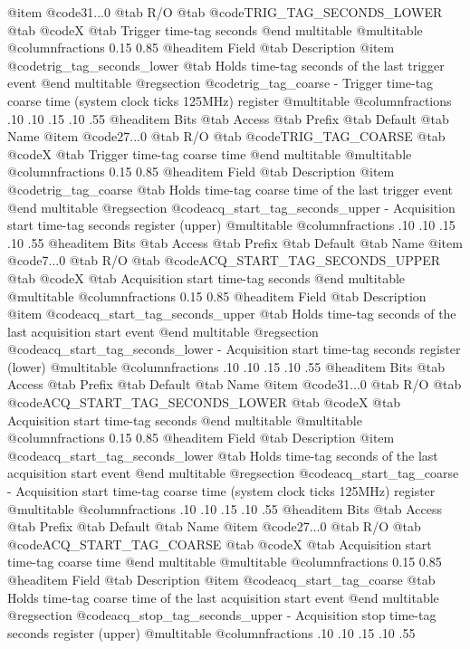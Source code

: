 @item @code{31...0}
@tab R/O @tab
@code{TRIG_TAG_SECONDS_LOWER}
@tab @code{X} @tab 
Trigger time-tag seconds
@end multitable
@multitable @columnfractions 0.15 0.85
@headitem Field @tab Description
@item @code{trig_tag_seconds_lower} @tab Holds time-tag seconds of the last trigger event
@end multitable
@regsection @code{trig_tag_coarse} - Trigger time-tag coarse time (system clock ticks 125MHz) register
@multitable @columnfractions .10 .10 .15 .10 .55
@headitem Bits @tab Access @tab Prefix @tab Default @tab Name
@item @code{27...0}
@tab R/O @tab
@code{TRIG_TAG_COARSE}
@tab @code{X} @tab 
Trigger time-tag coarse time
@end multitable
@multitable @columnfractions 0.15 0.85
@headitem Field @tab Description
@item @code{trig_tag_coarse} @tab Holds time-tag coarse time of the last trigger event
@end multitable
@regsection @code{acq_start_tag_seconds_upper} - Acquisition start time-tag seconds register (upper)
@multitable @columnfractions .10 .10 .15 .10 .55
@headitem Bits @tab Access @tab Prefix @tab Default @tab Name
@item @code{7...0}
@tab R/O @tab
@code{ACQ_START_TAG_SECONDS_UPPER}
@tab @code{X} @tab 
Acquisition start time-tag seconds
@end multitable
@multitable @columnfractions 0.15 0.85
@headitem Field @tab Description
@item @code{acq_start_tag_seconds_upper} @tab Holds time-tag seconds of the last acquisition start event
@end multitable
@regsection @code{acq_start_tag_seconds_lower} - Acquisition start time-tag seconds register (lower)
@multitable @columnfractions .10 .10 .15 .10 .55
@headitem Bits @tab Access @tab Prefix @tab Default @tab Name
@item @code{31...0}
@tab R/O @tab
@code{ACQ_START_TAG_SECONDS_LOWER}
@tab @code{X} @tab 
Acquisition start time-tag seconds
@end multitable
@multitable @columnfractions 0.15 0.85
@headitem Field @tab Description
@item @code{acq_start_tag_seconds_lower} @tab Holds time-tag seconds of the last acquisition start event
@end multitable
@regsection @code{acq_start_tag_coarse} - Acquisition start time-tag coarse time (system clock ticks 125MHz) register
@multitable @columnfractions .10 .10 .15 .10 .55
@headitem Bits @tab Access @tab Prefix @tab Default @tab Name
@item @code{27...0}
@tab R/O @tab
@code{ACQ_START_TAG_COARSE}
@tab @code{X} @tab 
Acquisition start time-tag coarse time
@end multitable
@multitable @columnfractions 0.15 0.85
@headitem Field @tab Description
@item @code{acq_start_tag_coarse} @tab Holds time-tag coarse time of the last acquisition start event
@end multitable
@regsection @code{acq_stop_tag_seconds_upper} - Acquisition stop time-tag seconds register (upper)
@multitable @columnfractions .10 .10 .15 .10 .55
